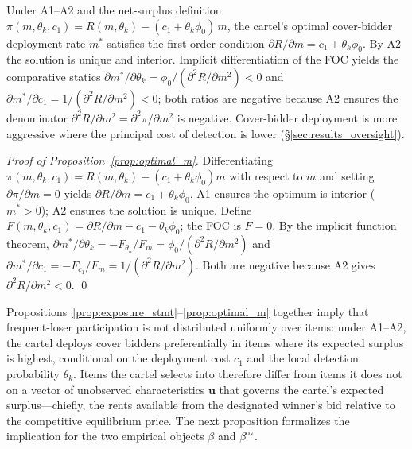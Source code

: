 \begin{proposition}\label{prop:optimal_m}
Under A1--A2 and the net-surplus definition $\pi(m, \theta_k,
c_1) = R(m, \theta_k) - (c_1 + \theta_k \phi_0)\,m$, the
cartel's optimal cover-bidder deployment rate $m^*$ satisfies
the first-order condition
$\partial R / \partial m = c_1 + \theta_k \phi_0$. By A2 the
solution is unique and interior. Implicit differentiation of
the FOC yields the comparative statics
$\partial m^*/\partial \theta_k = \phi_0 / (\partial^2 R /
\partial m^2) < 0$ and $\partial m^*/\partial c_1 = 1 /
(\partial^2 R / \partial m^2) < 0$; both ratios are negative
because A2 ensures the denominator
$\partial^2 R / \partial m^2 = \partial^2 \pi / \partial m^2$
is negative. Cover-bidder deployment is more aggressive where
the principal cost of detection is lower
(\S\ref{sec:results_oversight}).
\end{proposition}

\begin{proof}[Proof of Proposition~\ref{prop:optimal_m}]
Differentiating $\pi(m, \theta_k, c_1) = R(m, \theta_k) -
(c_1 + \theta_k \phi_0) m$ with respect to $m$ and setting
$\partial \pi / \partial m = 0$ yields $\partial R / \partial m
= c_1 + \theta_k \phi_0$. A1 ensures the optimum is interior
($m^* > 0$); A2 ensures the solution is unique. Define
$F(m, \theta_k, c_1) = \partial R / \partial m - c_1 - \theta_k
\phi_0$; the FOC is $F = 0$. By the implicit function theorem,
$\partial m^* / \partial \theta_k = -F_{\theta_k} / F_m =
\phi_0 / (\partial^2 R / \partial m^2)$ and
$\partial m^* / \partial c_1 = -F_{c_1} / F_m = 1 /
(\partial^2 R / \partial m^2)$. Both are negative because A2
gives $\partial^2 R / \partial m^2 < 0$. \qed
\end{proof}

Propositions~\ref{prop:exposure_stmt}--\ref{prop:optimal_m}
together imply that frequent-loser participation is not
distributed uniformly over items: under A1--A2, the cartel
deploys cover bidders preferentially in items where its expected
surplus is highest, conditional on the deployment cost $c_1$ and
the local detection probability $\theta_k$. Items the cartel
selects into therefore differ from items it does not on a vector
of unobserved characteristics $\mathbf{u}$ that governs the
cartel's expected surplus---chiefly, the rents available from
the designated winner's bid relative to the competitive
equilibrium price. The next proposition formalizes the
implication for the two empirical objects $\beta$ and
$\beta^{\text{ov}}$.

